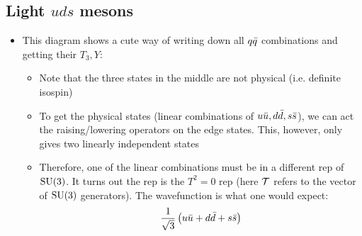\subsection{Light $uds$ mesons}
\begin{itemize}
  \item This diagram shows a cute way of writing down all $q{\bar{q}}$ combinations and getting their $T_3,Y$:
  \begin{itemize}
    \item Note that the three states in the middle are not physical (i.e. definite isospin)
    \item To get the physical states (linear combinations of $u\bar{u},d\bar{d},s\bar{s}$), we can act the raising/lowering operators on the edge states. This, however, only gives two linearly independent states
    \item Therefore, one of the linear combinations must be in a different rep of $\operatorname{SU}(3)$. It turns out the rep is the $T^2=0$ rep (here $\mathcal{T}$ refers to the vector of $\operatorname{SU}(3)$ generators). The wavefunction is what one would expect:
    \begin{equation}
      \frac{1}{\sqrt3} \left(u\bar{u}+d\bar{d}+s\bar{s}\right)
    \end{equation}
  \end{itemize}
\end{itemize}

